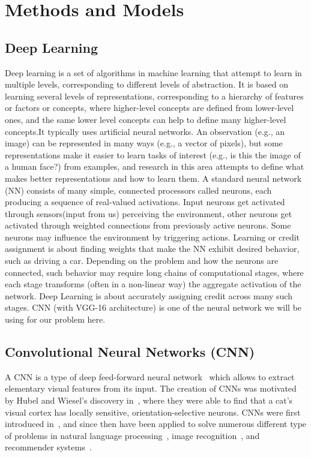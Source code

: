\section{Methods and Models}

\subsection{Deep Learning}
Deep learning is a set of algorithms in machine learning that attempt to learn in multiple levels, corresponding to different levels of abstraction. It is based on learning several levels of representations, corresponding to a hierarchy of features or factors or concepts, where higher-level concepts are defined from lower-level ones, and the same lower level concepts can help to define many higher-level concepts.It typically uses artificial neural networks. An observation (e.g., an image) can be represented in many ways (e.g., a vector of pixels), but some representations make it easier to learn tasks of interest (e.g., is this the image of a human face?) from examples, and research in this area attempts to define what makes better representations and how to learn them\cite{DeepLearning}.
A standard neural network (NN) consists of many simple, connected processors called neurons, each producing a sequence of real-valued activations. Input neurons get activated through sensors(input from us) perceiving the environment, other neurons get activated through weighted connections from previously active neurons. Some neurons may influence the environment by triggering actions.\cite{NeuralNetwork} Learning or credit assignment is about finding weights that make the NN exhibit desired behavior, such as driving a car. Depending on the problem and how the neurons are connected, such behavior may require long chains of computational stages, where each stage transforms (often in a non-linear way) the aggregate activation of the network. Deep Learning is about accurately assigning credit across many such stages. CNN (with VGG-16 architecture) is one of the neural network we will be using for our problem here.

\subsection{Convolutional Neural Networks (CNN)}

A CNN is a type of deep feed-forward neural network~\cite{cnn-star-galaxy} which allows to extract elementary visual features from its input. The creation of CNNs was motivated by Hubel and Wiesel's discovery in~\cite{hubel-wiesel-receptive-fields}, where they were able to find that a cat's visual cortex has locally sensitive, orientation-selective neurons. CNNs were first introduced in~\cite{Lecun99objectrecognition}, and since then have been applied to solve numerous different type of problems in  natural language processing~\cite{Collobert:2008:UAN:1390156.1390177}, image recognition~\cite{cnn-star-galaxy}, and recommender systems~\cite{NIPS2013_5004}.

